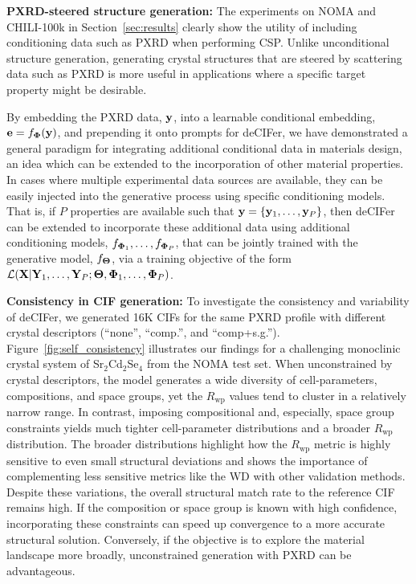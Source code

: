 {\bf PXRD-steered structure generation:} The experiments on NOMA and CHILI-100k in Section~\ref{sec:results} clearly show the utility of including conditioning data such as PXRD when performing CSP. Unlike unconditional structure generation, generating crystal structures that are steered by scattering data such as PXRD is more useful in applications where a specific target property might be desirable. 

By embedding the PXRD data, ${\mathbf y}$, into a learnable conditional embedding, ${\mathbf e} = f_{\mathbf{\Phi}}({\mathbf y})$, and prepending it onto prompts for deCIFer, we have demonstrated a general paradigm for integrating additional conditional data in materials design, an idea which can be extended to the incorporation of other material properties. In cases where multiple experimental data sources are available, they can be easily injected into the generative process using specific conditioning models. That is, if $P$ properties are available such that ${\mathbf y} = \{{\mathbf y}_1,\dots,{\mathbf y}_P\}$, then deCIFer can be extended to incorporate these additional data using additional conditioning models, $f_{{\mathbf{\Phi}}_1},\dots,f_{{\mathbf{\Phi}}_P}$, that can be jointly trained with the generative model, $f_{\mathbf \Theta}$, via a training objective of the form ${\mathcal L}({\mathbf X}|{\mathbf Y}_1,\dots,{\mathbf Y}_P; {\mathbf \Theta}, {\mathbf{\Phi}}_1,\dots,{\mathbf{\Phi}}_P)$.

{\bf Consistency in CIF generation:} To investigate the consistency and variability of deCIFer, we generated 16K CIFs for the same PXRD profile with different crystal descriptors (``none'', ``comp.'', and ``comp+s.g.''). Figure~\ref{fig:self_consistency} illustrates our findings for a challenging monoclinic crystal system of Sr$_2$Cd$_2$Se$_4$ from the NOMA test set. When unconstrained by crystal descriptors, the model generates a wide diversity of cell-parameters, compositions, and space groups, yet the $R_{\mathrm{wp}}$ values tend to cluster in a relatively narrow range. In contrast, imposing compositional and, especially, space group constraints yields much tighter cell-parameter distributions and a broader $R_{\mathrm{wp}}$ distribution. The broader distributions highlight how the $R_{\mathrm{wp}}$ metric is highly sensitive to even small structural deviations and shows the importance of complementing less sensitive metrics like the WD with other validation methods. Despite these variations, the overall structural match rate to the reference CIF remains high. If the composition or space group is known with high confidence, incorporating these constraints can speed up convergence to a more accurate structural solution. Conversely, if the objective is to explore the material landscape more broadly, unconstrained generation with PXRD can be advantageous.

